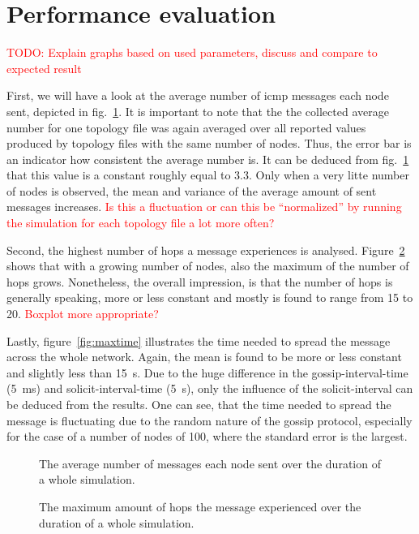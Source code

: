 \documentclass[12pt,journal]{IEEEtran}
\begin{document}
\section{Performance evaluation}
\textcolor{red}{TODO: Explain graphs based on used parameters, discuss and compare to expected result}

First, we will have a look at the average number of icmp messages each node sent, depicted in fig.~\ref{fig:avgmsg}. It is important to note that the the collected average number for one topology file was again averaged over all reported values produced by topology files with the same number of nodes. Thus, the error bar is an indicator how consistent the average number is. It can be deduced from fig.~\ref{fig:avgmsg} that this value is a constant roughly equal to 3.3. Only when a very litte number of nodes is observed, the mean and variance of the average amount of sent messages increases. \textcolor{red}{Is this a fluctuation or can this be ``normalized'' by running the simulation for each topology file a lot more often?}

Second, the highest number of hops a message experiences is analysed. Figure~\ref{fig:maxhops} shows that with a growing number of nodes, also the maximum of the number of hops grows. Nonetheless, the overall impression, is that the number of hops is generally speaking, more or less constant and mostly is found to range from 15 to 20. \textcolor{red}{Boxplot more appropriate?}

Lastly, figure~\ref{fig:maxtime} illustrates the time needed to spread the message across the whole network. Again, the mean is found to be more or less constant and slightly less than 15~s. Due to the huge difference in the gossip-interval-time (5~ms) and solicit-interval-time (5~s), only the influence of the solicit-interval can be deduced from the results. One can see, that the time needed to spread the message is fluctuating due to the random nature of the gossip protocol, especially for the case of a number of nodes of 100, where the standard error is the largest.

\begin{figure}
 \centering
 \caption{The average number of messages each node sent over the duration of a whole simulation.}
 \label{fig:avgmsg}
\end{figure}

\begin{figure}
 \centering
 \caption{The maximum amount of hops the message experienced over the duration of a whole simulation.}
 \label{fig:maxhops}
\end{figure}
\end{document}
